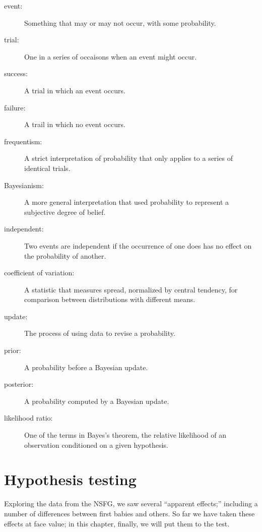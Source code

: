 \documentclass[12pt]{book}
\begin{document}
\begin{description}

\item[event:] Something that may or may not occur, with some probability.

\item[trial:] One in a series of occaisons when an event might occur.

\item[success:] A trial in which an event occurs.

\item[failure:] A trail in which no event occurs.

\item[frequentism:] A strict interpretation of probability that only
applies to a series of identical trials.

\item[Bayesianism:] A more general interpretation that used
probability to represent a subjective degree of belief.

\item[independent:] Two events are independent if the occurrence of
one does has no effect on the probability of another.

\item[coefficient of variation:] A statistic that measures spread,
normalized by central tendency, for comparison between distributions
with different means.

\item[update:] The process of using data to revise a probability.

\item[prior:] A probability before a Bayesian update.

\item[posterior:] A probability computed by a Bayesian update.

\item[likelihood ratio:] One of the terms in Bayes's theorem, the
relative likelihood of an observation conditioned on a given hypothesis.

\end{description}



\chapter{Hypothesis testing}

Exploring the data from the NSFG, we saw several ``apparent effects;''
including a number of differences between first babies and others.
So far we have taken these effects at face value; in this chapter,
finally, we will put them to the test.
\end{document}
